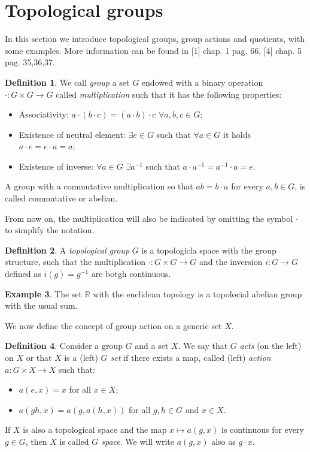 \documentclass[12pt,a4paper]{report}
\theoremstyle{definition}
\newtheorem{Def}{Definition}[chapter]
\theoremstyle{Theorem}
\theoremstyle{definition}
\newtheorem{Ex}[Def]{Example}
\theoremstyle{definition}
\begin{document}
		\section{Topological groups}
		In this section we introduce topological groups, group actions and quotients, with some examples. More information can be found in [1] chap. 1 pag. 66, [4] chap. 5 pag. 35,36,37. 
		\begin{Def}
			We call \textit{group} a set $G$ endowed with a binary operation $\cdot:G\times G\rightarrow G$ called \textit{multiplication} such that it has the following properties:
			\begin{itemize}
				\item Associativity: $a\cdot (b\cdot c)=(a\cdot b)\cdot c$ $\forall a,b,c\in G$;
				\item Existence of neutral element: $\exists e\in G$ such that $\forall a\in G$ it holds $a\cdot e=e\cdot a=a$;
				\item Existence of inverse: $\forall a\in G$ $\exists a^{-1}$ such that $a\cdot a^{-1}=a^{-1}\cdot a=e$.
			\end{itemize}
			A group with a commutative multiplication so that $ab= b\cdot a$ for every $a,b\in G$, is called commutative or abelian.
		\end{Def}
		From now on, the multiplication will also be indicated by omitting the symbol $\cdot$ to simplify the notation.
		\begin{Def}
			A \textit{topological group} $G$ is a topologicla space with the group structure, such that the multiplication $\cdot:G\times G\rightarrow G$ and the inversion $i:G\rightarrow G$ defined as $i(g)=g^{-1}$ are botgh continuous.
		\end{Def}
		\begin{Ex}
			The set $\mathbb{R}$ with the euclidean topology is a topolocial abelian group with the usual sum.
		\end{Ex}
		We now define the concept of group action on a generic set $X$.
		\begin{Def}
			Consider a group $G$ and a set $X$. We say that $G$ \textit{acts} (on the left) on $X$ or that $X$ is a (left) \textit{$G$ set} if there exists a map, called (left) \textit{action} $a:G\times X\rightarrow X$ such that:
			\begin{itemize}
				\item 	$a(e,x)=x$ for all $x\in X$;
				\item $a(gh,x)=a(g,a(h,x))$ for all $g,h\in G$ and $x\in X$.
			\end{itemize} 
			If $X$ is also a topological space and the map $x\longmapsto a(g,x)$ is continuous for every $g\in G$, then $X$ is called \textit{$G$ space}.
			We will write $a(g,x)$ also as $g\cdot x$.
		\end{Def}
\end{document}
